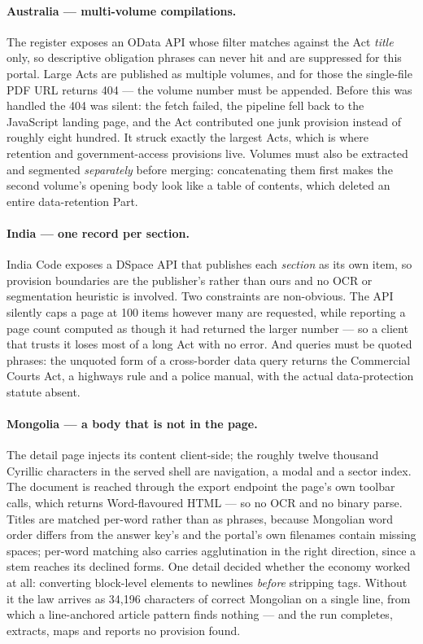 \documentclass{article}
\begin{document}
\paragraph{Australia --- multi-volume compilations.} The register exposes an
OData API whose filter matches against the Act \emph{title} only, so descriptive
obligation phrases can never hit and are suppressed for this portal. Large Acts
are published as multiple volumes, and for those the single-file PDF URL returns
404 --- the volume number must be appended. Before this was handled the 404 was
silent: the fetch failed, the pipeline fell back to the JavaScript landing page,
and the Act contributed one junk provision instead of roughly eight hundred. It
struck exactly the largest Acts, which is where retention and government-access
provisions live. Volumes must also be extracted and segmented \emph{separately}
before merging: concatenating them first makes the second volume's opening body
look like a table of contents, which deleted an entire data-retention Part.

\paragraph{India --- one record per section.} India Code exposes a DSpace API
that publishes each \emph{section} as its own item, so provision boundaries are
the publisher's rather than ours and no OCR or segmentation heuristic is
involved. Two constraints are non-obvious. The API silently caps a page at 100
items however many are requested, while reporting a page count computed as though
it had returned the larger number --- so a client that trusts it loses most of a
long Act with no error. And queries must be quoted phrases: the unquoted form of
a cross-border data query returns the Commercial Courts Act, a highways rule and
a police manual, with the actual data-protection statute absent.

\paragraph{Mongolia --- a body that is not in the page.} The detail page injects
its content client-side; the roughly twelve thousand Cyrillic characters in the
served shell are navigation, a modal and a sector index. The document is reached
through the export endpoint the page's own toolbar calls, which returns
Word-flavoured HTML --- so no OCR and no binary parse. Titles are matched
per-word rather than as phrases, because Mongolian word order differs from the
answer key's and the portal's own filenames contain missing spaces; per-word
matching also carries agglutination in the right direction, since a stem reaches
its declined forms. One detail decided whether the economy worked at all:
converting block-level elements to newlines \emph{before} stripping tags. Without
it the law arrives as 34{,}196 characters of correct Mongolian on a single line,
from which a line-anchored article pattern finds nothing --- and the run
completes, extracts, maps and reports no provision found.
\end{document}
